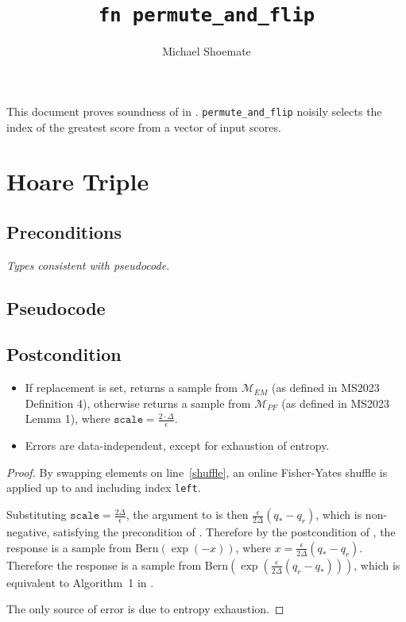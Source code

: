 \documentclass{article}
\title{\texttt{fn permute\_and\_flip}}
\author{Michael Shoemate}
\begin{document}
\maketitle\contrib
This document proves soundness of  \cite{mckenna2020permute} in . 
\texttt{permute\_and\_flip} noisily selects the index of the greatest score from a vector of input scores.

\section{Hoare Triple}
\subsection*{Preconditions}
\textit{Types consistent with pseudocode.}

\subsection*{Pseudocode}
\label{sec:python-pseudocode}


\subsection*{Postcondition}
\begin{theorem}
    \label{postcondition}
    \begin{itemize}
        \item If replacement is set, returns a sample from $\mathcal{M}_{EM}$ (as defined in MS2023 Definition 4),
            otherwise returns a sample from $\mathcal{M}_{PF}$ (as defined in MS2023 Lemma 1),
            where $\texttt{scale} = \frac{2 \cdot \Delta}{\epsilon}$.
        \item Errors are data-independent, except for exhaustion of entropy.
    \end{itemize}
\end{theorem}

\begin{proof}
    By swapping elements on line~\ref{shuffle},
    an online Fisher-Yates shuffle is applied up to and including index \texttt{left}.

    Substituting $\texttt{scale} = \frac{2\Delta}{\epsilon}$,
    the argument to  is then $\frac{\epsilon}{2\Delta}(q_* - q_r)$,
    which is non-negative, satisfying the precondition of .
    Therefore by the postcondition of , 
    the response is a sample from $\mathrm{Bern}(\exp(-x))$, where $x = \frac{\epsilon}{2\Delta}(q_* - q_r)$.
    Therefore the response is a sample from $\mathrm{Bern}(\exp(\frac{\epsilon}{2\Delta}(q_r - q_*)))$,
    which is equivalent to Algorithm~1 in \cite{mckenna2020permute}.

    The only source of error is due to entropy exhaustion.
\end{proof}



\end{document}
